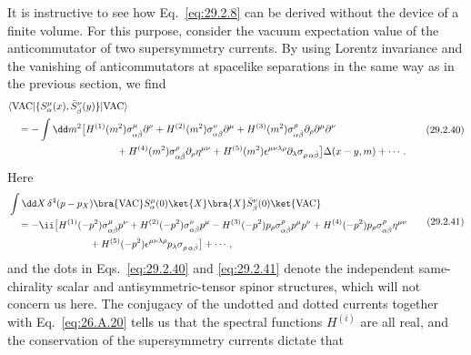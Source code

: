 It is instructive to see how Eq.~\eqref{eq:29.2.8} can be derived without
the device of a finite volume. For this purpose, consider the vacuum
expectation value of the anticommutator of two supersymmetry currents. By
using Lorentz invariance and the vanishing of anticommutators at spacelike
separations in the same way as in the previous section, we find
\begin{equation}
  \begin{aligned}
  &\langle\mathrm{VAC}\lvert
    \{S^\mu_\alpha(x),\bar S^\nu_{\dot\beta}(y)\}
  \rvert\mathrm{VAC}\rangle
  \\
  &\quad
  =-\int \dd m^2
  \bigl[
    H^{(1)}(m^2)\sigma^\mu_{\alpha\dot\beta}\partial^\nu
    +H^{(2)}(m^2)\sigma^\nu_{\alpha\dot\beta}\partial^\mu
    +H^{(3)}(m^2)\sigma^\rho_{\alpha\dot\beta}
      \partial_\rho\partial^\mu\partial^\nu
  \\
  &\hspace{38mm}
    +H^{(4)}(m^2)\sigma^\rho_{\alpha\dot\beta}
      \partial_\rho\eta^{\mu\nu}
    +H^{(5)}(m^2)\epsilon^{\mu\nu\lambda\rho}
      \partial_\lambda\sigma_{\rho\,\alpha\dot\beta}
  \bigr]\Delta(x-y,m)
  +\cdots\,.
  \end{aligned}
  \tag{29.2.40}\label{eq:29.2.40}
\end{equation}
Here
\begin{equation}
  \begin{aligned}
  &\int \dd X\,\delta^4(p-p_X)
  \bra{\mathrm{VAC}} S^\mu_\alpha(0)\ket{X}
  \bra{X}\bar S^\nu_{\dot\beta}(0)\ket{\mathrm{VAC}}
  \\
  &\quad
  =-\ii\bigl[
  H^{(1)}(-p^2)\sigma^\mu_{\alpha\dot\beta}p^\nu
  +H^{(2)}(-p^2)\sigma^\nu_{\alpha\dot\beta}p^\mu
  -H^{(3)}(-p^2)p_\rho\sigma^\rho_{\alpha\dot\beta}p^\mu p^\nu
  +H^{(4)}(-p^2)p_\rho\sigma^\rho_{\alpha\dot\beta}\eta^{\mu\nu}
  \\
  &\hspace{29mm}
  +H^{(5)}(-p^2)\epsilon^{\mu\nu\lambda\rho}
    p_\lambda\sigma_{\rho\,\alpha\dot\beta}\bigr]+\cdots\,,
  \end{aligned}
  \tag{29.2.41}\label{eq:29.2.41}
\end{equation}
and the dots in Eqs.~\eqref{eq:29.2.40} and \eqref{eq:29.2.41} denote the
independent same-chirality scalar and antisymmetric-tensor spinor
structures, which will not concern us here. The conjugacy of the undotted
and dotted currents together with Eq.~\eqref{eq:26.A.20} tells us that
the spectral functions \(H^{(i)}\) are all real, and the
conservation of the supersymmetry currents dictate that
